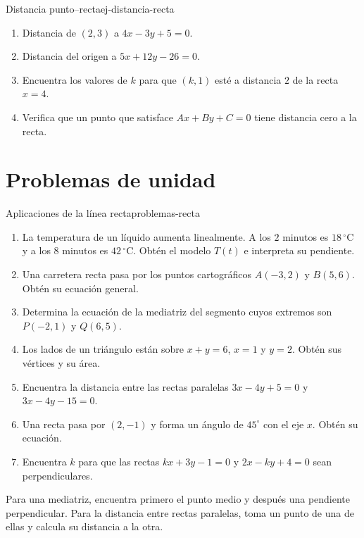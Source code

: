 \begin{exercise}{Distancia punto--recta}{ej-distancia-recta}
\begin{enumerate}[label=\alph*)]
  \item Distancia de $(2,3)$ a $4x-3y+5=0$.
  \item Distancia del origen a $5x+12y-26=0$.
  \item Encuentra los valores de $k$ para que $(k,1)$ esté a distancia $2$
  de la recta $x=4$.
  \item Verifica que un punto que satisface $Ax+By+C=0$ tiene distancia cero
  a la recta.
\end{enumerate}
\end{exercise}

\section{Problemas de unidad}

\begin{problem}{Aplicaciones de la línea recta}{problemas-recta}
\begin{enumerate}
  \item La temperatura de un líquido aumenta linealmente. A los $2$ minutos
  es $18\,{}^\circ\mathrm C$ y a los $8$ minutos es
  $42\,{}^\circ\mathrm C$. Obtén el modelo $T(t)$ e interpreta su pendiente.
  \item Una carretera recta pasa por los puntos cartográficos $A(-3,2)$ y
  $B(5,6)$. Obtén su ecuación general.
  \item Determina la ecuación de la mediatriz del segmento cuyos extremos son
  $P(-2,1)$ y $Q(6,5)$.
  \item Los lados de un triángulo están sobre $x+y=6$, $x=1$ y $y=2$.
  Obtén sus vértices y su área.
  \item Encuentra la distancia entre las rectas paralelas
  $3x-4y+5=0$ y $3x-4y-15=0$.
  \item Una recta pasa por $(2,-1)$ y forma un ángulo de $45^\circ$ con el
  eje $x$. Obtén su ecuación.
  \item Encuentra $k$ para que las rectas $kx+3y-1=0$ y
  $2x-ky+4=0$ sean perpendiculares.
\end{enumerate}
\end{problem}

\begin{hints}
Para una mediatriz, encuentra primero el punto medio y después una pendiente
perpendicular. Para la distancia entre rectas paralelas, toma un punto de una
de ellas y calcula su distancia a la otra.
\end{hints}

